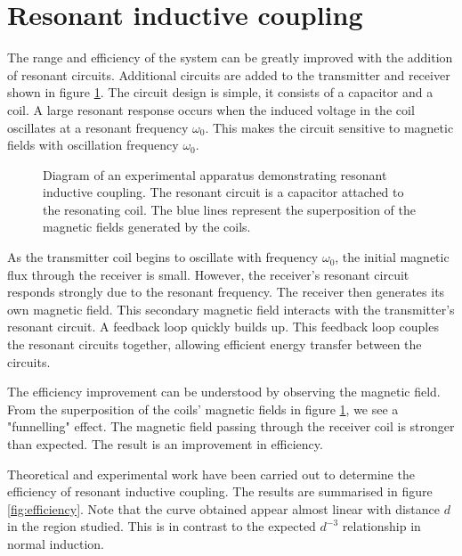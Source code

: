 \documentclass[a4paper,justified,nobib]{tufte-handout}
\begin{document}
\section{Resonant inductive coupling}

The range and efficiency of the system can be greatly improved with the addition of
resonant circuits.
Additional circuits are added to the transmitter and receiver shown in figure
\ref{fig:setupresonance}.
The circuit design is simple, it consists of a capacitor and a coil.
A large resonant response occurs when the induced voltage in the coil oscillates
at a resonant frequency $\omega_0$.
This makes the circuit sensitive to magnetic fields with oscillation
frequency $\omega_0$.

\begin{figure}
  \center
  
  \caption{Diagram of an experimental apparatus demonstrating resonant inductive coupling.
    The resonant circuit is a capacitor attached to the resonating coil.
    The blue lines represent the superposition of the magnetic fields generated by the coils.}
    \label{fig:setupresonance}
\end{figure}


As the transmitter coil begins to oscillate with frequency $\omega_0$,
the initial magnetic flux through the receiver is small.
However, the receiver's resonant circuit responds strongly due to the resonant frequency.
The receiver then generates its own magnetic field.
This secondary magnetic field interacts with the transmitter's resonant circuit.
A feedback loop quickly builds up.
This feedback loop couples the resonant circuits together,
allowing efficient energy transfer between the circuits.

The efficiency improvement can be understood by observing the magnetic field.
From the superposition of the coils' magnetic fields in figure 
\ref{fig:setupresonance},
we see a "funnelling" effect.
The magnetic field passing through the receiver coil is stronger than expected.
The result is an improvement in efficiency.\cite{Efficient}

Theoretical and experimental work have been carried out to determine the
efficiency of resonant inductive coupling.\cite{Efficient}\cite{StrongCouple} 
The results are summarised in figure \ref{fig:efficiency}.
Note that the curve obtained appear almost linear with distance $d$
in the region studied.
This is in contrast to the expected $d^{-3}$ relationship in normal induction.
\end{document}
